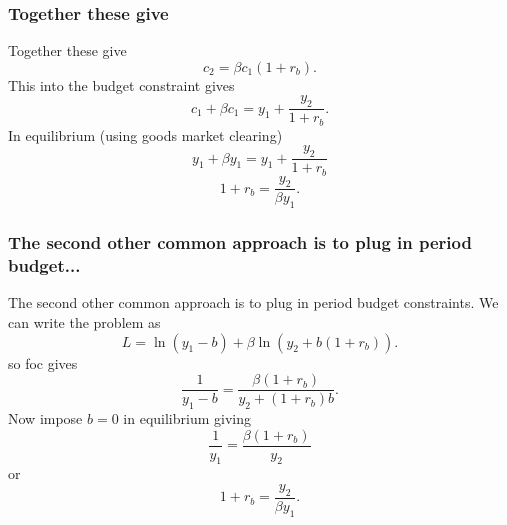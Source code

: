 \documentclass[aspectratio=169]{ltx-talk}
\begin{document}
\begin{frame}
\frametitle{Together these give}
Together these give 
\begin{equation*}
c_{2}=\beta c_{1}\left( 1+r_{b}\right) .
\end{equation*}%
This into the budget constraint gives%
\begin{equation*}
c_{1}+\beta c_{1}=y_{1}+\frac{y_{2}}{1+r_{b}}.
\end{equation*}%
In equilibrium (using goods market clearing) 
\begin{equation*}
y_{1}+\beta y_{1}=y_{1}+\frac{y_{2}}{1+r_{b}}
\end{equation*}%
\begin{equation*}
1+r_{b}=\frac{y_{2}}{\beta y_{1}}.
\end{equation*}%
\end{frame}

\begin{frame}
\frametitle{The second other common approach is to plug in period budget...}
The second other common approach is to plug in period budget constraints. We
can write the problem as%
\begin{equation*}
L=\ln \left( y_{1}-b\right) +\beta \ln \left( y_{2}+b\left( 1+r_{b}\right)
\right) .
\end{equation*}%
so foc gives 
\begin{equation*}
\frac{1}{y_{1}-b}=\frac{\beta \left( 1+r_{b}\right) }{y_{2}+\left(
1+r_{b}\right) b}.
\end{equation*}%
Now impose $b=0$ in equilibrium giving 
\begin{equation*}
\frac{1}{y_{1}}=\frac{\beta \left( 1+r_{b}\right) }{y_{2}}
\end{equation*}%
or 
\begin{equation*}
1+r_{b}=\frac{y_{2}}{\beta y_{1}}.
\end{equation*}%
\end{frame}
\end{document}
